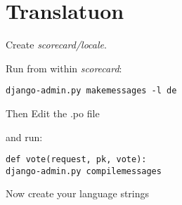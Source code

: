 \section{Translatuon}

Create \emph{scorecard/locale}.

Run from within \emph{scorecard}:

\begin{lstlisting}[style=Bash, caption=webtech/config.py, label=lst:config.py1]
django-admin.py makemessages -l de
\end{lstlisting}

Then Edit the .po file


and run:
\begin{lstlisting}[style=Bash, caption=Add messages to views, label=lst:views_msg]def vote(request, pk, vote):
django-admin.py compilemessages
\end{lstlisting}

Now create your language strings